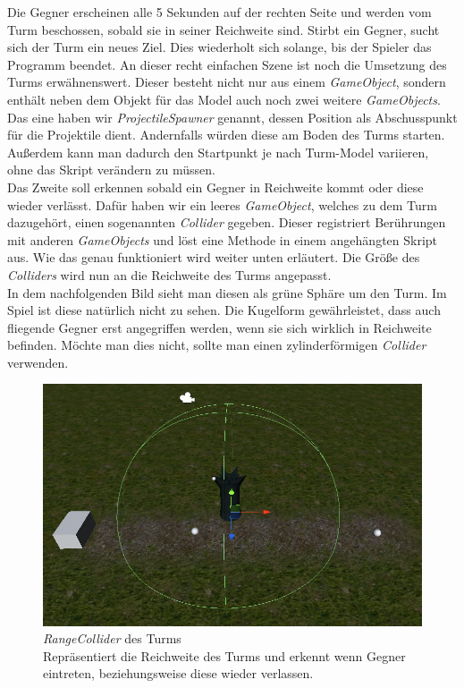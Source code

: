 Die Gegner erscheinen alle 5 Sekunden auf der rechten Seite und werden vom Turm beschossen, sobald sie in seiner Reichweite sind. Stirbt ein Gegner, sucht sich der Turm ein neues Ziel. Dies wiederholt sich solange, bis der Spieler das Programm beendet. An dieser recht einfachen Szene ist noch die Umsetzung des Turms erwähnenswert. Dieser besteht nicht nur aus einem \textit{GameObject}, sondern enthält neben dem Objekt für das Model auch noch zwei weitere \textit{GameObjects}. Das eine haben wir \textit{ProjectileSpawner} genannt, dessen Position als Abschusspunkt für die Projektile dient. Andernfalls würden diese am Boden des Turms starten. Außerdem kann man dadurch den Startpunkt je nach Turm-Model variieren, ohne das Skript verändern zu müssen.\\
Das Zweite soll erkennen sobald ein Gegner in Reichweite kommt oder diese wieder verlässt. Dafür haben wir ein leeres \textit{GameObject}, welches zu dem Turm dazugehört, einen sogenannten \textit{Collider} gegeben. Dieser registriert Berührungen mit anderen \textit{GameObjects} und löst eine Methode in einem angehängten Skript aus. Wie das genau funktioniert wird weiter unten erläutert. Die Größe des \textit{Colliders} wird nun an die Reichweite des Turms angepasst.\\
In dem nachfolgenden Bild sieht man diesen als grüne Sphäre um den Turm. Im Spiel ist diese natürlich nicht zu sehen. Die Kugelform gewährleistet, dass auch fliegende Gegner erst angegriffen werden, wenn sie sich wirklich in Reichweite befinden. Möchte man dies nicht, sollte man einen zylinderförmigen \textit{Collider} verwenden.\\

\begin{figure}[h]
\centering
\includegraphics[width=0.8\linewidth]{./images/Kapitel_Ergebnis_und_Ausblick/Tower_RangeCollider}
\caption[\textit{RangeCollider} des Turms]{\textit{RangeCollider} des Turms\\Repräsentiert die Reichweite des Turms und erkennt wenn Gegner eintreten, beziehungsweise diese wieder verlassen.}
\label{fig:Tower_RangeCollider}
\end{figure}
\clearpage 

